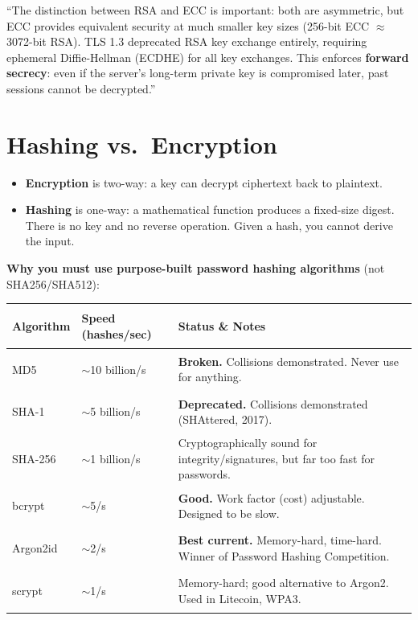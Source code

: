 \documentclass[11pt, letterpaper]{article}
\newcommand{\talkingpoint}[1]{%
  \begin{tcolorbox}[colback=talkbg, colframe=talkborder,
    title={\bfseries Interview Talking Point}, arc=3pt, boxrule=1pt]
  #1
  \end{tcolorbox}%
}
\begin{document}
\talkingpoint{``The distinction between RSA and ECC is important: both are asymmetric, but ECC provides equivalent security at much smaller key sizes (256-bit ECC $\approx$ 3072-bit RSA). TLS 1.3 deprecated RSA key exchange entirely, requiring ephemeral Diffie-Hellman (ECDHE) for all key exchanges. This enforces \textbf{forward secrecy}: even if the server's long-term private key is compromised later, past sessions cannot be decrypted.''}

\section*{Hashing vs.\ Encryption}

\begin{itemize}[noitemsep]
  \item \textbf{Encryption} is two-way: a key can decrypt ciphertext back to plaintext.
  \item \textbf{Hashing} is one-way: a mathematical function produces a fixed-size digest. There is no key and no reverse operation. Given a hash, you cannot derive the input.
\end{itemize}

\textbf{Why you must use purpose-built password hashing algorithms} (not SHA256/SHA512):

\noindent
{\renewcommand{\arraystretch}{1.5}
\begin{tabularx}{\textwidth}{>{\bfseries\raggedright\arraybackslash}p{3cm}
                              >{\centering\arraybackslash}p{2.5cm}
                              >{\raggedright\arraybackslash}X}
\toprule
\rowcolor{tableheaderteal}
\textbf{Algorithm} & \textbf{Speed (hashes/sec)} & \textbf{Status \& Notes} \\
\midrule
\rowcolor{rowRe} MD5       & $\sim$10 billion/s & \textbf{Broken.} Collisions demonstrated. Never use for anything. \\
\rowcolor{rowRe} SHA-1     & $\sim$5 billion/s  & \textbf{Deprecated.} Collisions demonstrated (SHAttered, 2017). \\
\rowcolor{rowOr} SHA-256   & $\sim$1 billion/s  & Cryptographically sound for integrity/signatures, but far too fast for passwords. \\
\rowcolor{rowA}  bcrypt    & $\sim$5/s          & \textbf{Good.} Work factor (cost) adjustable. Designed to be slow. \\
\rowcolor{rowBg} Argon2id  & $\sim$2/s          & \textbf{Best current.} Memory-hard, time-hard. Winner of Password Hashing Competition. \\
\rowcolor{rowA}  scrypt    & $\sim$1/s          & Memory-hard; good alternative to Argon2. Used in Litecoin, WPA3. \\
\bottomrule
\end{tabularx}}
\end{document}
